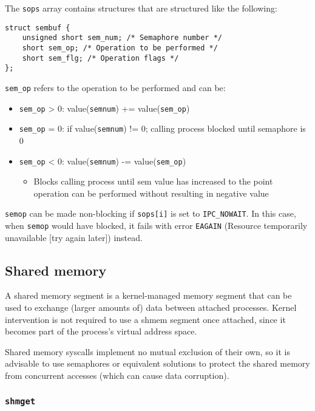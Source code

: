 \documentclass{article}
\begin{document}
The \texttt{sops} array contains structures that are structured like the following:

\begin{verbatim}
struct sembuf {
    unsigned short sem_num; /* Semaphore number */
    short sem_op; /* Operation to be performed */
    short sem_flg; /* Operation flags */
};
\end{verbatim}

\texttt{sem\_op} refers to the operation to be performed and can be:

\begin{itemize}
    \item \texttt{sem\_op} > 0: value(\texttt{semnum}) += value(\texttt{sem\_op})
    \item \texttt{sem\_op} = 0: if value(\texttt{semnum}) != 0; calling process blocked until semaphore is 0
    \item \texttt{sem\_op} < 0: value(\texttt{semnum}) -= value(\texttt{sem\_op})
        \begin{itemize}
            \item Blocks calling process until sem value has increased to the point operation can be performed without resulting in negative value
        \end{itemize}
\end{itemize}

\texttt{semop} can be made non-blocking if \texttt{sops[i]} is set to \texttt{IPC\_NOWAIT}. In this case, when \texttt{semop} would have blocked, it fails with error \texttt{EAGAIN} (Resource temporarily unavailable [try again later]) instead.


\subsection{Shared memory}

A shared memory segment is a kernel-managed memory segment that can be used to exchange (larger amounts of) data between attached processes. Kernel intervention is not required to use a shmem segment once attached, since it becomes part of the process's virtual address space.

Shared memory syscalls implement no mutual exclusion of their own, so it is advisable to use semaphores or equivalent solutions to protect the shared memory from concurrent accesses (which can cause data corruption).


\subsubsection{\texttt{shmget}}
\end{document}
